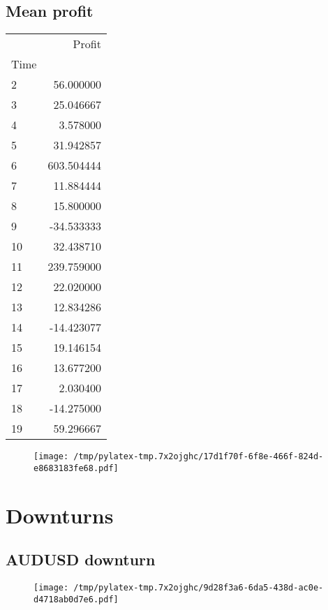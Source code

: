 \documentclass{article}%
\begin{document}
\subsection{Mean profit }%
\label{subsec:Meanprofit}%
\begin{tabular}{lr}
\toprule
{} &      Profit \\
Time &             \\
\midrule
2    &   56.000000 \\
3    &   25.046667 \\
4    &    3.578000 \\
5    &   31.942857 \\
6    &  603.504444 \\
7    &   11.884444 \\
8    &   15.800000 \\
9    &  -34.533333 \\
10   &   32.438710 \\
11   &  239.759000 \\
12   &   22.020000 \\
13   &   12.834286 \\
14   &  -14.423077 \\
15   &   19.146154 \\
16   &   13.677200 \\
17   &    2.030400 \\
18   &  -14.275000 \\
19   &   59.296667 \\
\bottomrule
\end{tabular}
%


\begin{figure}[htbp]%
\centering%
\texttt{[image: /tmp/pylatex-tmp.7x2ojghc/17d1f70f-6f8e-466f-824d-e8683183fe68.pdf]}%
\end{figure}

%
\newpage %
\section{Downturns}%
\label{sec:Downturns}%
\subsection{AUDUSD downturn}%
\label{subsec:AUDUSDdownturn}%


\begin{figure}[htbp]%
\centering%
\texttt{[image: /tmp/pylatex-tmp.7x2ojghc/9d28f3a6-6da5-438d-ac0e-d4718ab0d7e6.pdf]}%
\end{figure}
\end{document}
